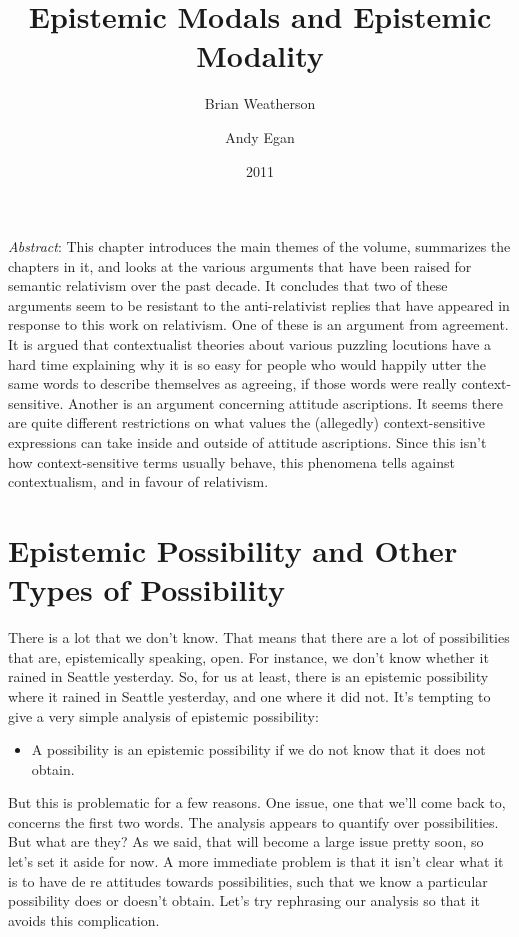 \documentclass[
  11pt,
  letterpaper,
  DIV=11,
  numbers=noendperiod,
  twoside]{scrartcl}
\title{Epistemic Modals and Epistemic Modality}
\author{Brian Weatherson \and Andy Egan}
\date{2011}
\providecommand{\tightlist}{%
  \setlength{\itemsep}{0pt}\setlength{\parskip}{0pt}}\usepackage{longtable,booktabs,array}
\renewenvironment{abstract}
 {\vspace{-1.25cm}
 \quotation\small\noindent\emph{Abstract}:}
 {\endquotation}
\begin{document}
\maketitle
\begin{abstract}
This chapter introduces the main themes of the volume, summarizes the
chapters in it, and looks at the various arguments that have been raised
for semantic relativism over the past decade. It concludes that two of
these arguments seem to be resistant to the anti-relativist replies that
have appeared in response to this work on relativism. One of these is an
argument from agreement. It is argued that contextualist theories about
various puzzling locutions have a hard time explaining why it is so easy
for people who would happily utter the same words to describe themselves
as agreeing, if those words were really context-sensitive. Another is an
argument concerning attitude ascriptions. It seems there are quite
different restrictions on what values the (allegedly) context-sensitive
expressions can take inside and outside of attitude ascriptions. Since
this isn't how context-sensitive terms usually behave, this phenomena
tells against contextualism, and in favour of relativism.
\end{abstract}


\section{Epistemic Possibility and Other Types of
Possibility}\label{epistemic-possibility-and-other-types-of-possibility}

There is a lot that we don't know. That means that there are a lot of
possibilities that are, epistemically speaking, open. For instance, we
don't know whether it rained in Seattle yesterday. So, for us at least,
there is an epistemic possibility where it rained in Seattle yesterday,
and one where it did not. It's tempting to give a very simple analysis
of epistemic possibility:

\begin{itemize}
\tightlist
\item
  A possibility is an epistemic possibility if we do not know that it
  does not obtain.
\end{itemize}

But this is problematic for a few reasons. One issue, one that we'll
come back to, concerns the first two words. The analysis appears to
quantify over possibilities. But what are they? As we said, that will
become a large issue pretty soon, so let's set it aside for now. A more
immediate problem is that it isn't clear what it is to have de re
attitudes towards possibilities, such that we know a particular
possibility does or doesn't obtain. Let's try rephrasing our analysis so
that it avoids this complication.
\end{document}
